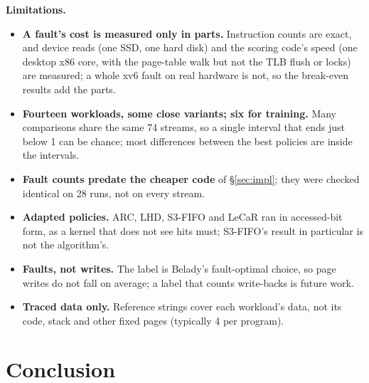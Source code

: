 \documentclass{article}
\newcommand{\belady}{Belady\xspace}
\newcommand{\finding}[1]{\textbf{#1}\hspace{0.4em}}
\begin{document}
\finding{Limitations.}
\begin{itemize}
\item \textbf{A fault's cost is measured only in parts.} Instruction counts are exact, and
  device reads (one SSD, one hard disk) and the scoring code's speed (one desktop x86 core,
  with the page-table walk but not the TLB flush or locks) are measured; a whole xv6 fault
  on real hardware is not, so the break-even results add the parts.
\item \textbf{Fourteen workloads, some close variants; six for training.} Many comparisons
  share the same 74 streams, so a single interval that ends just below 1 can be chance;
  most differences between the best policies are inside the intervals.
\item \textbf{Fault counts predate the cheaper code} of \S\ref{sec:impl}; they were checked
  identical on 28 runs, not on every stream.
\item \textbf{Adapted policies.} ARC, LHD, S3-FIFO and LeCaR ran in accessed-bit form, as
  a kernel that does not see hits must; S3-FIFO's result in particular is not the
  algorithm's.
\item \textbf{Faults, not writes.} The label is \belady's fault-optimal choice, so page
  writes do not fall on average; a label that counts write-backs is future work.
\item \textbf{Traced data only.} Reference strings cover each workload's data, not its code,
  stack and other fixed pages (typically 4 per program).
\end{itemize}
\section{Conclusion}
\label{sec:conclusion}
\end{document}
